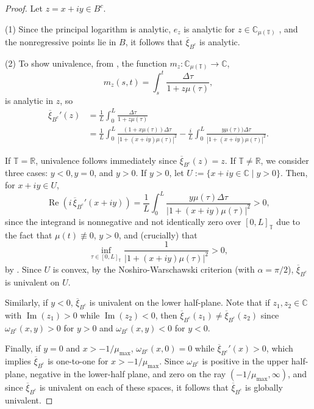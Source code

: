 \documentclass[reqno]{amsart}
\DeclareMathOperator{\myRe}{Re}
\DeclareMathOperator{\myIm}{Im}
\begin{document}
\begin{proof}
Let $z=x+iy\in B^c$.

(1) Since the principal logarithm is analytic, $e_{z}$ is analytic for
$z \in \mathbb{C}_{\mu(\mathbb{T})}$ \cite{Ka}, and the nonregressive points lie in $B$,
it follows that $\overline{\xi}_{B^c}$ is analytic.

(2) To show univalence, from \cite{Ka}, the function $m_z:\mathbb{C}_{\mu(\mathbb{T})} \to \mathbb{C}$,
$$
m_z(s,t) = \int_{s}^{t} \frac{\Delta \tau}{1+z\mu(\tau)},
$$
is analytic in $z$, so
\begin{equation}
\begin{aligned}
\overline{\xi}_{B^c}'(z)
& = \frac{1}{L} \int_{0}^{L} \frac{\Delta \tau}{1+z \mu(\tau)}  \\
& = \frac{1}{L} \int_{0}^{L} \frac{(1+x \mu(\tau))\Delta \tau}{|1+(x+iy)\mu(\tau)|^2}
- \frac{i}{L} \int_{0}^{L} \frac{y \mu(\tau))\Delta \tau}{|1+(x+iy)\mu(\tau)|^2}.
\end{aligned} \label{calc}
\end{equation}

If $\mathbb{T}=\mathbb{R}$, univalence follows immediately since $\overline{\xi}_{B^c}(z) = z$.
If $\mathbb{T}\not=\mathbb{R}$, we consider three cases: $y<0,y=0$, and $y>0$. If $y>0$, let
$U := \{x+iy \in \mathbb{C} \mid y>0 \}$. Then, for $x+iy \in U$,
 \[
 \myRe(i\,\overline{\xi}_{B^c}'(x+iy))
  = \frac{1}{L} \int_{0}^{L} \frac{y \mu(\tau)\Delta \tau}{|1+(x+iy)\mu(\tau)|^2}>0,
 \]
since the integrand is nonnegative and not identically zero over $[0,L]_{\mathbb{T}}$ due to
the fact that $\mu(t) \not \equiv 0$, $y>0$, and (crucially) that
 $$
 \inf_{\tau \in [0,L]_{\mathbb{T}}} \frac{1}{|1+(x+iy) \mu(\tau)|^2} >0,
 $$
by \cite[Lemma 2.1]{Ka}. Since $U$ is convex, by the Noshiro-Warschawski criterion
(with $\alpha=\pi/2$), $\overline{\xi}_{B^c}$ is univalent on $U$.

Similarly, if $y<0$, $\overline{\xi}_{B^c}$ is univalent on the lower half-plane.
Note that if $z_1, z_2 \in \mathbb{C}$ with $\myIm(z_1)>0$ while $\myIm(z_2)<0$, then
$\overline{\xi}_{B^c}(z_1) \neq \overline{\xi}_{B^c}(z_2)$ since $\omega_{B^c}(x,y)>0$ for $y>0$
and $\omega_{B^c}(x,y)<0$ for $y<0$.

 Finally, if $y=0$ and $x> -1/\mu_{\max}$, $\omega_{B^c}(x,0) =0$ while
$\overline{\xi}_{B^c}'(x)>0$, which implies $\overline{\xi}_{B^c}$ is one-to-one for $x>-1/\mu_{\max}$.
Since $\omega_{B^c}$ is positive in the upper half-plane, negative in the lower-half
plane, and zero on the ray $(-1/\mu_{\max},\infty)$, and since $\overline{\xi}_{B^c}$ is
univalent on each of these spaces, it follows that $\overline{\xi}_{B^c}$ is globally
univalent.
\end{proof}
\end{document}
